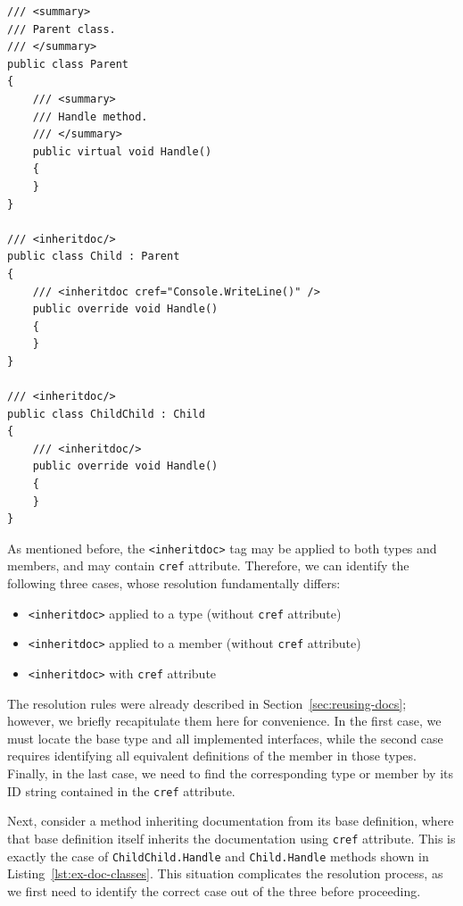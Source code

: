\begin{listing}[H]
\begin{lstlisting}
/// <summary>
/// Parent class.
/// </summary>
public class Parent
{
    /// <summary>
    /// Handle method.
    /// </summary>
    public virtual void Handle()
    {
    }
}

/// <inheritdoc/>
public class Child : Parent
{
    /// <inheritdoc cref="Console.WriteLine()" />   
    public override void Handle()
    {
    }
}

/// <inheritdoc/>
public class ChildChild : Child
{
    /// <inheritdoc/>
    public override void Handle()
    {
    }
}
\end{lstlisting}
\caption{Example class hierarchy with \texttt{<inheritdoc>} tags}
\label{lst:ex-doc-classes}
\end{listing}

As mentioned before, the \texttt{<inheritdoc>} tag may be applied to both types and members, and may contain \texttt{cref} attribute.
Therefore, we can identify the following three cases, whose resolution fundamentally differs:

\begin{itemize}
    \item \texttt{<inheritdoc>} applied to a type (without \texttt{cref} attribute)
    \item \texttt{<inheritdoc>} applied to a member (without \texttt{cref} attribute)
    \item \texttt{<inheritdoc>} with \texttt{cref} attribute
\end{itemize}

The resolution rules were already described in Section~\ref{sec:reusing-docs}; however, we briefly recapitulate them here for convenience.
In the first case, we must locate the base type and all implemented interfaces,
while the second case requires identifying all equivalent definitions of the member in those types.
Finally, in the last case, we need to find the corresponding type or member by its ID string contained in the \texttt{cref} attribute.

Next, consider a method inheriting documentation from its base definition, where that base definition itself inherits the documentation using \texttt{cref} attribute. 
This is exactly the case of \texttt{ChildChild.Handle} and \texttt{Child.Handle} methods shown in Listing~\ref{lst:ex-doc-classes}.
This situation complicates the resolution process, as we first need to identify the correct case out of the three before proceeding.

